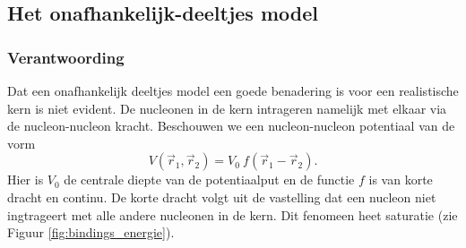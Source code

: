 \documentclass[12pt]{article}
\begin{document}
\subsection{Het onafhankelijk-deeltjes model}
\subsubsection{Verantwoording}

Dat een onafhankelijk deeltjes model een goede benadering is voor een realistische kern is niet evident. De nucleonen in de kern intrageren namelijk met elkaar via de nucleon-nucleon kracht. Beschouwen we een nucleon-nucleon potentiaal van de vorm
\begin{equation}
V(\vec{r}_1, \vec{r}_2) = V_0 \  f(\vec{r}_1 - \vec{r}_2).
\end{equation}
Hier is $V_0$ de centrale diepte van de potentiaalput en de functie $f$ is van korte dracht en continu. De korte dracht volgt uit de vastelling dat een nucleon niet ingtrageert met alle andere nucleonen in de kern. Dit fenomeen heet saturatie (zie Figuur \ref{fig:bindings_energie}). 
\end{document}
